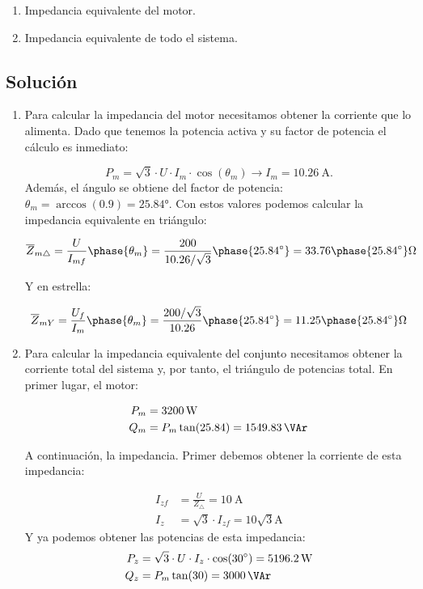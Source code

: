 \begin{enumerate}
\item Impedancia equivalente del motor.
\item Impedancia equivalente de todo el sistema.
\end{enumerate}

\subsection*{Solución}

\begin{enumerate}
\item Para calcular la impedancia del motor necesitamos obtener la corriente que lo alimenta. Dado que tenemos la potencia activa y su factor de potencia el cálculo es inmediato:

  \[
    P_m = \sqrt{3} \cdot U \cdot I_m \cdot \cos(\theta_m) \rightarrow I_m = \qty{10.26}{\ampere}.
  \]
Además, el ángulo se obtiene del factor de potencia: $\theta_m = \arccos(0.9) = \ang{25.84}$.
  Con estos valores podemos calcular la impedancia equivalente en triángulo:

  \[
    \overline{Z}_{m\triangle} = \frac{U}{I_{mf}}\phase{\theta_m} = \frac{200}{10.26/\sqrt{3}}\phase{\ang{25.84}} = 33.76\phase{\ang{25.84}}\unit{\ohm}
  \]

  Y en estrella:

\[
  \overline{Z}_{mY} = \frac{U_f}{I_{m}}\phase{\theta_m} = \frac{200/\sqrt{3}}{10.26}\phase{\ang{25.84}} = 11.25\phase{\ang{25.84}}\unit{\ohm}
  \]
 
\item Para calcular la impedancia equivalente del conjunto necesitamos obtener la corriente total del sistema y, por tanto, el triángulo de potencias total. En primer lugar, el motor:

  \begin{align*}
    P_m &= \qty{3200}{\watt}\\
    Q_m &= P_m \tan(25.84) = \qty{1549.83}{\VAr}
  \end{align*}

  A continuación, la impedancia. Primer debemos obtener la corriente de esta impedancia:

  \begin{align*}
    I_{zf} &= \frac{U}{Z_\triangle} = \qty{10}{\ampere}\\
    I_z &= \sqrt{3}\cdot I_{zf} = 10\sqrt{3}\unit{\ampere}
  \end{align*}
  Y ya podemos obtener las potencias de esta impedancia:
  \begin{align*}
    P_z &= \sqrt{3}\cdot U \cdot I_z \cdot \cos(\ang{30}) = \qty{5196.2}{\watt}\\
    Q_z &= P_m \tan(30) = \qty{3000}{\VAr}
  \end{align*}


\end{enumerate}
